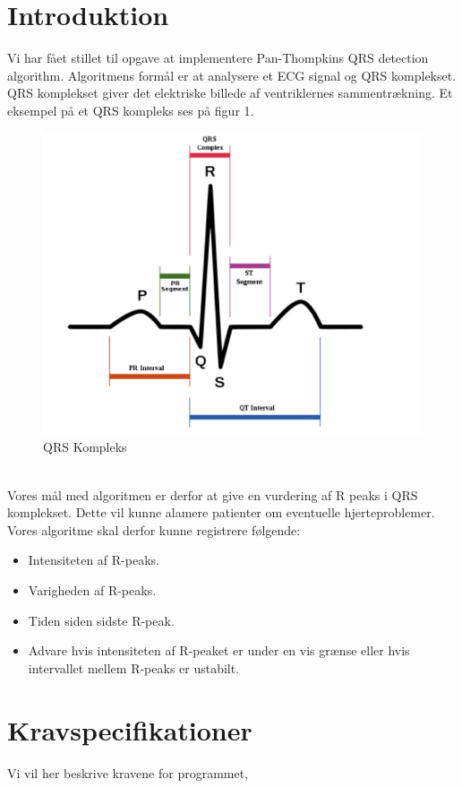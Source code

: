 \documentclass[a4paper,12pt]{article}
\begin{document}
\section*{Introduktion}
Vi har fået stillet til opgave at implementere Pan-Thompkins QRS detection algorithm. Algoritmens formål er at analysere et ECG signal og QRS komplekset. QRS komplekset giver det elektriske billede af ventriklernes sammentrækning. Et eksempel på et QRS kompleks ses på figur 1.\\
\begin{figure}[htp]
\centering
\includegraphics[scale=0.5]{qrs.png}
\caption{QRS Kompleks}
\label{Figur 1: QRS}
\end{figure}\\
Vores mål med algoritmen er derfor at give en vurdering af R peaks i QRS komplekset. Dette vil kunne alamere patienter om eventuelle hjerteproblemer. Vores algoritme skal derfor kunne registrere følgende:
\begin{itemize}
\item Intensiteten af R-peaks.
\item Varigheden af R-peaks.
\item Tiden siden sidste R-peak.
\item Advare hvis intensiteten af R-peaket er under en vis grænse eller hvis intervallet mellem R-peaks er ustabilt.
\end{itemize}
\newpage
\tableofcontents
\newpage
\section{Kravspecifikationer}
Vi vil her beskrive kravene for programmet, 
\end{document}
